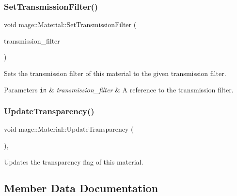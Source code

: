 \subsubsection{\texorpdfstring{Set\+Transmission\+Filter()}{SetTransmissionFilter()}\hspace{0.1cm}{\footnotesize\ttfamily [2/2]}}
{\footnotesize\ttfamily void mage\+::\+Material\+::\+Set\+Transmission\+Filter (\begin{DoxyParamCaption}\item[{\hyperlink{structmage_1_1_r_g_b_spectrum}{R\+G\+B\+Spectrum} \&\&}]{transmission\+\_\+filter }\end{DoxyParamCaption})\hspace{0.3cm}{\ttfamily [noexcept]}}

Sets the transmission filter of this material to the given transmission filter.


\begin{DoxyParams}[1]{Parameters}
\mbox{\tt in}  & {\em transmission\+\_\+filter} & A reference to the transmission filter. \\
\hline
\end{DoxyParams}
\hypertarget{structmage_1_1_material_a32525508f9083fd0336e92146083d822}{}\label{structmage_1_1_material_a32525508f9083fd0336e92146083d822} 
\subsubsection{\texorpdfstring{Update\+Transparency()}{UpdateTransparency()}}
{\footnotesize\ttfamily void mage\+::\+Material\+::\+Update\+Transparency (\begin{DoxyParamCaption}{ }\end{DoxyParamCaption})\hspace{0.3cm}{\ttfamily [private]}, {\ttfamily [noexcept]}}

Updates the transparency flag of this material. 

\subsection{Member Data Documentation}
\hypertarget{structmage_1_1_material_a5df6757f08aa50c83dc349698f9f7017}{}\label{structmage_1_1_material_a5df6757f08aa50c83dc349698f9f7017} 
